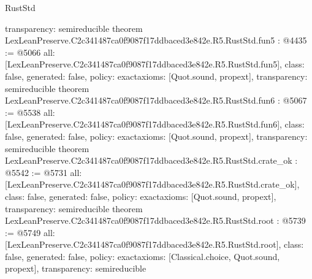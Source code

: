 \begin{lexlean}{RustStd}
\begin{coremodule}
{  transparency: semireducible
}
theorem LexLeanPreserve.C2c341487ca0f9087f17ddbaced3e842e.R5.RustStd.fun5 : @4435 := @5066 {
  all: [LexLeanPreserve.C2c341487ca0f9087f17ddbaced3e842e.R5.RustStd.fun5],
  class: false,
  generated: false,
  policy: exact{axioms: [Quot.sound, propext]},
  transparency: semireducible
}
theorem LexLeanPreserve.C2c341487ca0f9087f17ddbaced3e842e.R5.RustStd.fun6 : @5067 := @5538 {
  all: [LexLeanPreserve.C2c341487ca0f9087f17ddbaced3e842e.R5.RustStd.fun6],
  class: false,
  generated: false,
  policy: exact{axioms: [Quot.sound, propext]},
  transparency: semireducible
}
theorem LexLeanPreserve.C2c341487ca0f9087f17ddbaced3e842e.R5.RustStd.crate_ok : @5542 := @5731 {
  all: [LexLeanPreserve.C2c341487ca0f9087f17ddbaced3e842e.R5.RustStd.crate_ok],
  class: false,
  generated: false,
  policy: exact{axioms: [Quot.sound, propext]},
  transparency: semireducible
}
theorem LexLeanPreserve.C2c341487ca0f9087f17ddbaced3e842e.R5.RustStd.root : @5739 := @5749 {
  all: [LexLeanPreserve.C2c341487ca0f9087f17ddbaced3e842e.R5.RustStd.root],
  class: false,
  generated: false,
  policy: exact{axioms: [Classical.choice, Quot.sound, propext]},
  transparency: semireducible
}


\end{coremodule}
\end{lexlean}
